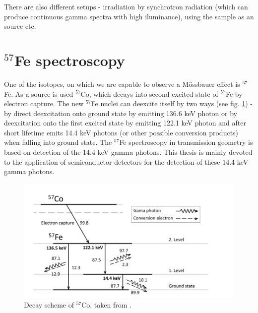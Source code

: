 \par
There are also different setups - irradiation by synchrotron radiation (which can produce continuous gamma spectra with high iluminance), using the sample as an source etc.



\section{$^{57}$Fe spectroscopy}

One of the isotopes, on which we are capable to observe a Mössbauer effect is $^{57}$Fe. As a source is used $^{57}$Co, which decays into second excited state of $^{57}$Fe by electron capture. The new $^{57}$Fe nuclei can deexcite itself by two ways (see fig. \ref{Fe57scheme}) - by direct deexcitation onto ground state by emitting 136.6 keV photon or by deexcitation onto the first excited state by emitting 122.1 keV photon and after short lifetime emits 14.4 keV photons (or other possible conversion products) when falling into ground state. The $^{57}$Fe spectroscopy in transmission geometry is based on detection of the 14.4 keV gamma photons. This thesis is mainly devoted to the application of semiconductor detectors for the detection of these 14.4 keV gamma photons.

\begin{figure}[H]
 \centering
 \includegraphics[scale=0.75, angle = 0]{./pictures/Fe57}
 \caption{Decay scheme of $^{57}$Co, taken from \cite{NOVAK2016thesis}.}
 \label{Fe57scheme}
 
\end{figure}


